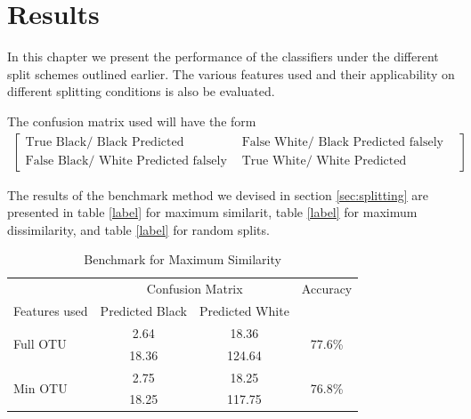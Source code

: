 \chapter{Results}

\ifpdf
    \graphicspath{{Chapter3/Figs/Raster/}{Chapter3/Figs/PDF/}{Chapter3/Figs/}}
\else
    \graphicspath{{Chapter3/Figs/Vector/}{Chapter3/Figs/}}
\fi

In this chapter we present the performance of the classifiers under the different split schemes outlined earlier. The various features used and their applicability on different splitting conditions is also be evaluated. 

The confusion matrix used will have the form 
\begin{align}
	\begin{bmatrix}
	\text{True Black/ Black Predicted correctly}&\text{False White/ Black  Predicted falsely}\\
	\text{False Black/ White Predicted falsely}&\text{True White/ White  Predicted correctly}
	\end{bmatrix}
\end{align}



The results of the benchmark method we devised in section \ref{sec:splitting} are presented in table \ref{label} for maximum similarit, table \ref{label} for maximum dissimilarity, and table \ref{label} for random splits.


\begin{table}
	\centering
	\begin{tabular}{l c c c}
		\toprule 
		&\multicolumn{2}{c}{Confusion Matrix} &Accuracy\\
		Features used & Predicted Black&Predicted White&\\ 
		
		\midrule
		\multirow{2}{*}{Full OTU }& 	2.64 & 18.36&		\multirow{2}{*}{77.6\%}\\
					&	18.36 &124.64&\\
		\cmidrule{2-3}
		\multirow{2}{*}{Min OTU}  &2.75 & 18.25&		\multirow{2}{*}{76.8\%}\\
		&18.25& 117.75&\\
		\bottomrule
		\hline 
	\end{tabular}
	\caption{Benchmark for Maximum Similarity}
	\label{table:benchmarksim}
\end{table}

